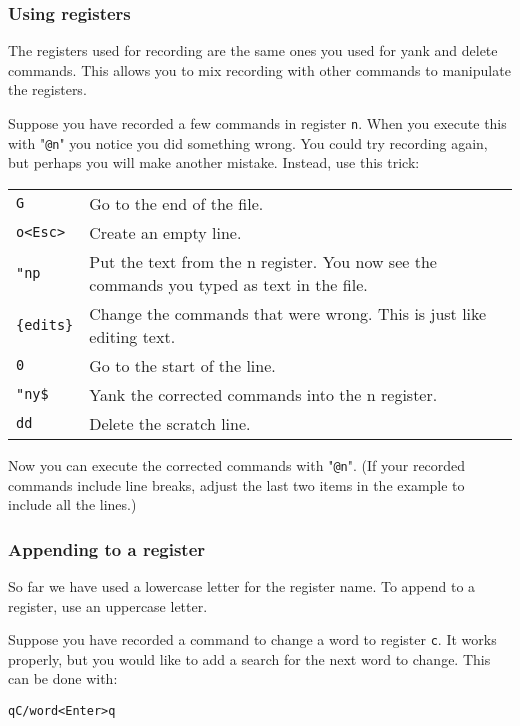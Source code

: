 \subsubsection{Using registers}
The registers used for recording are the same ones you used for yank and delete commands.
This allows you to mix recording with other commands to manipulate the registers.

Suppose you have recorded a few commands in register \texttt{n}.
When you execute this with "\texttt{@n}" you notice you did something wrong.
You could try recording again, but perhaps you will make another mistake.
Instead, use this trick:

\begin{center}\begin{tabular}{l l}
				\texttt{G} & Go to the end of the file. \\
				\texttt{o<Esc>} & Create an empty line. \\
				\texttt{"np} & Put the text from the n register.  You now see the commands you typed as text in the file. \\
				\texttt{\{edits\}} & Change the commands that were wrong.  This is just like editing text. \\
				\texttt{0} & Go to the start of the line. \\
				\texttt{"ny\$} & Yank the corrected commands into the n register. \\
				\texttt{dd} & Delete the scratch line. \\
\end{tabular}\end{center}

Now you can execute the corrected commands with "\texttt{@n}".
(If your recorded commands include line breaks, adjust the last two items in the example to include all the lines.)
\subsubsection{Appending to a register}
So far we have used a lowercase letter for the register name.
To append to a register, use an uppercase letter.

Suppose you have recorded a command to change a word to register \texttt{c}.
It works properly, but you would like to add a search for the next word to change.
This can be done with:

\begin{Verbatim}[samepage=true]
 qC/word<Enter>q
\end{Verbatim}

